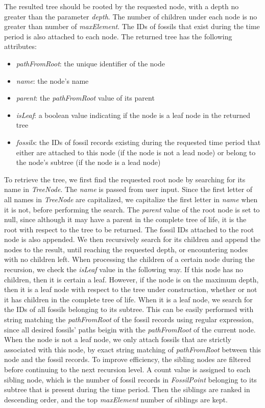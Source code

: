 \documentclass[11pt, a4paper,oneside,chapterprefix=false]{scrbook}
\begin{document}
The resulted tree should be rooted by the requested node, with a depth no greater than the parameter \emph{depth}. The number of children under each node is no greater than number of \emph{maxElement}. The IDs of fossils that exist during the time period is also attached to each node. The returned tree has the following attributes:  

\begin{itemize}
	\item \textit{pathFromRoot}: the unique identifier of the node
	\item \textit{name}: the node's name
	\item \textit{parent}: the \textit{pathFromRoot} value of its parent
	\item \textit{isLeaf}: a boolean value indicating if the node is a leaf node in the returned tree
	\item \textit{fossils}: the IDs of fossil records existing during the requested time period that either are attached to this node (if the node is not a lead node) or belong to the node's subtree (if the node is a lead node)
\end{itemize}

To retrieve the tree, we first find the requested root node by searching for its name in \emph{TreeNode}. The \emph{name} is passed from user input. Since the first letter of all names in \emph{TreeNode} are capitalized, we capitalize the first letter in \emph{name} when it is not, before performing the search. The \emph{parent} value of the root node is set to null, since although it may have a parent in the complete tree of life, it is the root with respect to the tree to be returned. The fossil IDs attached to the root node is also appended. We then recursively search for its children and append the nodes to the result, until reaching the requested depth, or encountering nodes with no children left. When processing the children of a certain node during the recursion, we check the \emph{isLeaf} value in the following way. If this node has no children, then it is certain a leaf. However, if the node is on the maximum depth, then it is a leaf node with respect to the tree under construction, whether or not it has children in the complete tree of life. When it is a leaf node, we search for the IDs of all fossils belonging to its subtree. This can be easily performed with string matching the \emph{pathFromRoot} of the fossil records using regular expression, since all desired fossils' paths beigin with the \emph{pathFromRoot} of the current node. When the node is not a leaf node, we only attach fossils that are strictly associated with this node, by exact string matching of \emph{pathFromRoot} between this node and the fossil records. To improve efficiency, the sibling nodes are filtered before continuing to the next recursion level. A count value is assigned to each sibling node, which is the number of fossil records in \emph{FossilPoint} belonging to its subtree that is present during the time period. Then the siblings are ranked in descending order, and the top \emph{maxElement} number of siblings are kept. \\
\end{document}
